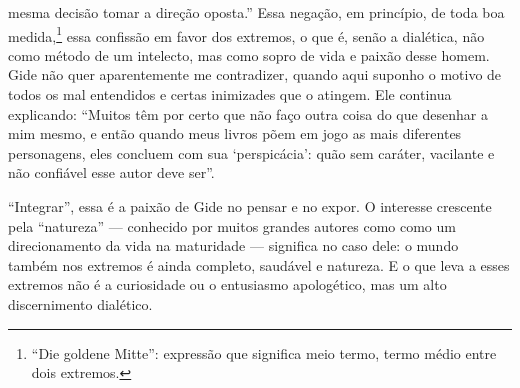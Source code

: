 mesma decisão tomar a direção oposta.'' Essa negação, em princípio, de
toda boa medida,\footnote{``Die goldene Mitte'': expressão que
  significa meio termo, termo médio entre dois extremos. \versal{[N. T.]}} essa
confissão em favor dos extremos, o que é, senão a dialética, não como
método de um intelecto, mas como sopro de vida e paixão desse homem.
Gide não quer aparentemente me contradizer, quando aqui suponho o motivo
de todos os mal entendidos e certas inimizades que o atingem. Ele
continua explicando: ``Muitos têm por certo que não faço outra coisa do
que desenhar a mim mesmo, e então quando meus livros põem em jogo as
mais diferentes personagens, eles concluem com sua `perspicácia': quão
sem caráter, vacilante e não confiável esse autor deve ser''.

``Integrar'', essa é a paixão de Gide no pensar e no expor. O interesse
crescente pela ``natureza'' --- conhecido por muitos grandes autores como
como um direcionamento da vida na maturidade --- significa no caso dele:
o mundo também nos extremos é ainda completo, saudável e natureza. E o
que leva a esses extremos não é a curiosidade ou o entusiasmo
apologético, mas um alto discernimento dialético.

